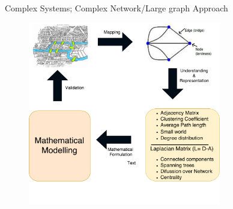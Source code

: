 \documentclass{beamer}
\begin{document}
\begin{frame}{Complex Systems; Complex Network/Large graph Approach}
	
	\begin{figure}[!h]
		\centering
		\includegraphics[width=0.75\textwidth]{images/abstract-diagram.pdf}
		\caption{}
	\end{figure}
	
\end{frame}

\end{document}
